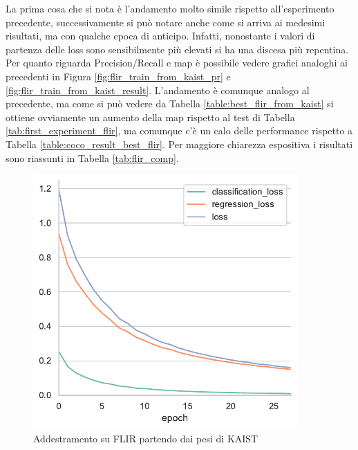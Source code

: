 La prima cosa che si nota è l'andamento molto simile rispetto all'esperimento precedente, successivamente si può notare anche come si arriva ai medesimi risultati, ma con qualche epoca di anticipo. Infatti, nonostante i valori di partenza delle loss sono sensibilmente più elevati si ha una discesa più repentina. Per quanto riguarda Precision/Recall e \ac{map} è possibile vedere grafici analoghi ai precedenti in Figura \ref{fig:flir_train_from_kaist_pr} e \ref{fig:flir_train_from_kaist_result}. L'andamento è comunque analogo al precedente, ma come si può vedere da Tabella \ref{table:best_flir_from_kaist} si ottiene ovviamente un aumento della \ac{map} rispetto al test di Tabella \ref{tab:first_experiment_flir}, ma comunque c'è un calo delle performance rispetto a Tabella \ref{table:coco_result_best_flir}. Per maggiore chiarezza espositiva i risultati sono riassunti in Tabella \ref{tab:flir_comp}.
\begin{figure}[]
    \centering
    \includegraphics[width=0.9\textwidth]{images/graphic/flir_from_kaist.pdf}
    \caption{Addestramento su FLIR partendo dai pesi di KAIST}
    \label{fig:flir_train_from_kaist}
\end{figure}
